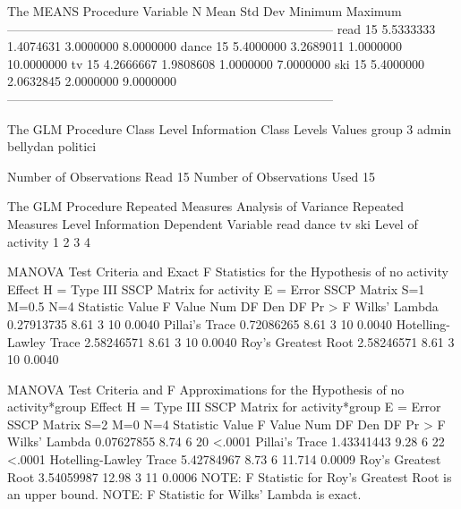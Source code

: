 \documentclass{article}
\begin{document}
\begin{Woutput}
The MEANS Procedure
Variable     N            Mean         Std Dev         Minimum         Maximum
------------------------------------------------------------------------------
read        15       5.5333333       1.4074631       3.0000000       8.0000000
dance       15       5.4000000       3.2689011       1.0000000      10.0000000
tv          15       4.2666667       1.9808608       1.0000000       7.0000000
ski         15       5.4000000       2.0632845       2.0000000       9.0000000
------------------------------------------------------------------------------

The GLM Procedure
            Class Level Information
Class         Levels    Values
group              3    admin bellydan politici

Number of Observations Read          15
Number of Observations Used          15

The GLM Procedure
Repeated Measures Analysis of Variance
           Repeated Measures Level Information
Dependent Variable        read    dance       tv      ski
 Level of activity           1        2        3        4

                  MANOVA Test Criteria and Exact F Statistics
                    for the Hypothesis of no activity Effect
                     H = Type III SSCP Matrix for activity
                             E = Error SSCP Matrix
                              S=1    M=0.5    N=4
Statistic                        Value    F Value    Num DF    Den DF    Pr > F
Wilks' Lambda               0.27913735       8.61         3        10    0.0040
Pillai's Trace              0.72086265       8.61         3        10    0.0040
Hotelling-Lawley Trace      2.58246571       8.61         3        10    0.0040
Roy's Greatest Root         2.58246571       8.61         3        10    0.0040

                 MANOVA Test Criteria and F Approximations for
                   the Hypothesis of no activity*group Effect
                  H = Type III SSCP Matrix for activity*group
                             E = Error SSCP Matrix
                               S=2    M=0    N=4
Statistic                        Value    F Value    Num DF    Den DF    Pr > F
Wilks' Lambda               0.07627855       8.74         6        20    <.0001
Pillai's Trace              1.43341443       9.28         6        22    <.0001
Hotelling-Lawley Trace      5.42784967       8.73         6    11.714    0.0009
Roy's Greatest Root         3.54059987      12.98         3        11    0.0006
         NOTE: F Statistic for Roy's Greatest Root is an upper bound.
                 NOTE: F Statistic for Wilks' Lambda is exact.


\end{Woutput}
\end{document}
